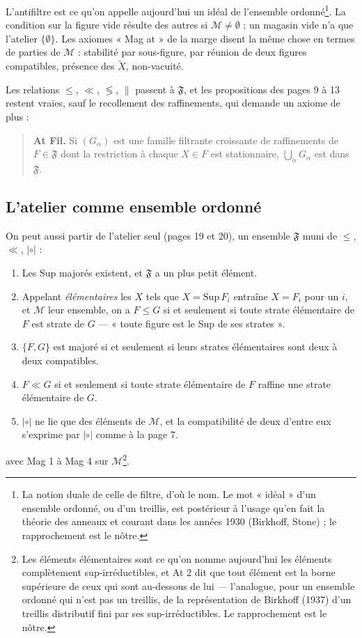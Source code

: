 \documentclass[11pt,a4paper]{article}
\begin{document}
L'antifiltre est ce qu'on appelle aujourd'hui un idéal de l'ensemble
ordonné\footnote{La notion duale de celle de filtre, d'où le nom. Le mot
« idéal » d'un ensemble ordonné, ou d'un treillis, est postérieur à
l'usage qu'en fait la théorie des anneaux et courant dans les années 1930
(Birkhoff, Stone) ; le rapprochement est le nôtre.}. La condition sur la figure
vide résulte des autres si $\mathcal{M} \neq \emptyset$ ; un magasin vide n'a
que l'atelier $\{\emptyset\}$. Les axiomes « Mag at » de la marge disent la même
chose en termes de parties de $\mathcal{M}$ : stabilité par sous-figure, par
réunion de deux figures compatibles, présence des $\widetilde{X}$, non-vacuité.

Les relations $\leq$, $\ll$, $\lessgtr$, $\parallel$ passent à
$\mathfrak{F}$, et les propositions des pages 9 à 13 restent vraies, sauf le
recollement des raffinements, qui demande un axiome de plus :
\begin{quote}
\textbf{At Fil.} Si $(G_{\alpha})$ est une famille filtrante croissante de
raffinements de $F \in \mathfrak{F}$ dont la restriction à chaque $X \in F$ est
stationnaire, $\bigcup_{\alpha} G_{\alpha}$ est dans $\mathfrak{F}$.
\end{quote}

\subsection*{L'atelier comme ensemble ordonné}

On peut aussi partir de l'atelier seul (pages 19 et 20), un ensemble
$\mathfrak{F}$ muni de $\leq$, $\ll$, $\mathrel{|\circ|}$ :
\begin{enumerate}
\item[At 1.] Les Sup majorés existent, et $\mathfrak{F}$ a un plus petit
élément.
\item[At 2.] Appelant \emph{élémentaires} les $X$ tels que $X = \mathrm{Sup}\,
F_{i}$ entraîne $X = F_{i}$ pour un $i$, et $\mathcal{M}$ leur ensemble, on a
$F \leq G$ si et seulement si toute strate élémentaire de $F$ est strate de $G$
--- « toute figure est le Sup de ses strates ».
\item[At 3.] $\{F, G\}$ est majoré si et seulement si leurs strates
élémentaires sont deux à deux compatibles.
\item[At 4.] $F \ll G$ si et seulement si toute strate élémentaire de $F$
raffine une strate élémentaire de $G$.
\item[At 5.] $\mathrel{|\circ|}$ ne lie que des éléments de $\mathcal{M}$, et
la compatibilité de deux d'entre eux s'exprime par $\mathrel{|\circ|}$ comme à
la page 7.
\end{enumerate}
avec Mag 1 à Mag 4 sur $\mathcal{M}$\footnote{Les éléments élémentaires sont
ce qu'on nomme aujourd'hui les éléments complètement sup-irréductibles, et At 2
dit que tout élément est la borne supérieure de ceux qui sont au-dessous de lui
--- l'analogue, pour un ensemble ordonné qui n'est pas un treillis, de la
représentation de Birkhoff (1937) d'un treillis distributif fini par ses
sup-irréductibles. Le rapprochement est le nôtre.}.
\end{document}
